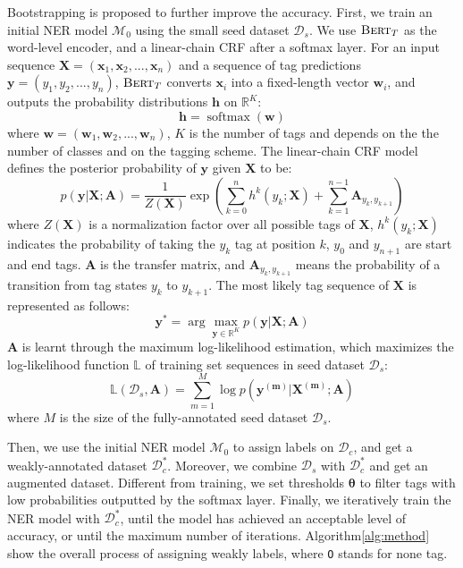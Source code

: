 \documentclass[10pt, conference, compsocconf]{IEEEtran}
\newcommand{\bert}{\textsc{Bert}\xspace}
\newcommand{\Vw}{\mathbf{w}}
\newcommand{\Vtheta}{\boldsymbol{\theta}}
\newcommand{\MA}{\mathbf{A}}
\DeclareMathOperator{\softmax}{softmax}
\begin{document}
Bootstrapping is proposed to further improve the accuracy.
First, we train an initial NER model $\mathcal{M}_0$ using the small seed dataset $\mathcal{D}_s$.
We use $\bert_T$ as the word-level encoder, and a linear-chain CRF after a softmax layer.
For an input sequence $ \mathbf{X} = (\mathbf{x}_1, \mathbf{x}_2, ..., \mathbf{x}_n) $ and 
a sequence of tag predictions $ \mathbf{y} = (y_1, y_2, ..., y_n) $, 
$\bert_T$ converts $\mathbf{x}_i$ into a fixed-length vector $\mathbf{w}_i$, and outputs the
probability distributions $\mathbf{h}$ on $\mathbb{R}^K$:
\begin{equation}
    \mathbf{h}= \softmax(\mathbf{w})
    \end{equation}
    where $ \mathbf{w} = (\Vw_1, \Vw_2, ..., \Vw_n) $, 
    $K$ is the number of tags and depends on the the number of classes and on the tagging scheme.
The linear-chain CRF model defines the posterior probability of 
$\mathbf{y}$ given $\mathbf{X}$ to be:
\begin{equation} 
    p(\mathbf{y}|\mathbf{X};\MA) = \frac{1}{Z(\mathbf{X})}\exp \left(\sum_{k=0}^{n} h^{k}(y_{k};\mathbf{X}) + \sum_{k=1}^{n-1} \MA_{y_k,y_{k+1}} \right)
    \end{equation}
    where $Z(\mathbf{X})$ is a normalization factor over all possible tags of $\mathbf{X}$, 
     $h^k(y_k;\mathbf{X})$  indicates the probability of taking the $y_k$ tag at position $k$,
    $y_0$ and $y_{n+1}$ are start and end tags.
    $\MA$ is the transfer matrix, and 
     $\MA_{y_k,y_{k+1}}$ means the probability of 
     a transition from tag states $y_k$ to $y_{k+1}$.
    The most likely tag sequence of $\mathbf{X}$ is represented as follows:
    \begin{equation}
        \mathbf{y}^{*} = \arg\max_{\mathbf{y} \in \mathbb{R}^K} p(\mathbf{y}|\mathbf{X};\MA)
    \end{equation}
     $\MA$ is learnt through the maximum log-likelihood estimation, 
    which maximizes the log-likelihood function $\mathbb{L}$ of 
    training set sequences in seed dataset $\mathcal{D}_s$:
    \begin{equation}
        \mathbb{L}(\mathcal{D}_s, \MA)  =  \sum_{m=1}^{M}\log p(\mathbf{y^{(m)}}|\mathbf{X^{(m)}};\MA) 
    \end{equation}
    where $M$ is the size of the fully-annotated seed dataset $\mathcal{D}_s$.

 Then, we use the initial NER model $\mathcal{M}_0$ to assign labels on $\mathcal{D}_c$, and get a
 weakly-annotated dataset $\mathcal{D}^{*}_{c}$. Moreover,
 we combine $\mathcal{D}_{s}$ with $\mathcal{D}^{*}_{c}$ and get
 an augmented dataset.
 Different from training, we set thresholds $\Vtheta$ to filter tags with low probabilities outputted by the 
 softmax layer. Finally, we iteratively train the NER model with $\mathcal{D}^{*}_{c}$,
 until the model has achieved an acceptable level of accuracy,
or until the maximum number of iterations. 
Algorithm\ref{alg:method} show the overall process of assigning weakly labels,
where {\tt O} stands for none tag.
\end{document}
